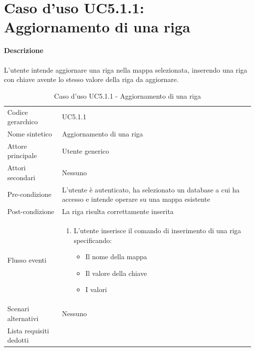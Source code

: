\documentclass[a4paper]{report}
\begin{document}
	 \section{Caso d'uso UC5.1.1: Aggiornamento di una riga}
	 \textbf{Descrizione} \\ \\
	 L'utente intende aggiornare una riga nella mappa selezionata, inserendo una riga con chiave avente lo
	  stesso valore della riga da aggiornare.
		\begin{table}[H]
		\begin{tabularx}{\textwidth}{X | X}\toprule
			\rowcolor{orange!65}Codice gerarchico & UC5.1.1\\
			Nome sintetico & Aggiornamento di una riga\\
			\rowcolor{orange!65}Attore principale & Utente generico\\
			Attori secondari & Nessuno \\
			\rowcolor{orange!65}Pre-condizione & L'utente è autenticato, ha selezionato un database a cui ha 
			accesso e intende operare su una mappa esistente \\
			Post-condizione & La riga risulta correttamente inserita\\
			\rowcolor{orange!65}Flusso eventi & \begin{enumerate}
			\item L'utente inserisce il comando di inserimento di una riga specificando:
			\begin{itemize}
				\item Il nome della mappa
				\item Il valore della chiave
				\item I valori
			\end{itemize}
			\end{enumerate} \\
			Scenari alternativi & Nessuno \\
			\rowcolor{orange!65}Lista requisiti dedotti & \\
			\bottomrule
		\end{tabularx}
		\caption{Caso d'uso UC5.1.1 - Aggiornamento di una riga}
	 \end{table}
\end{document}
